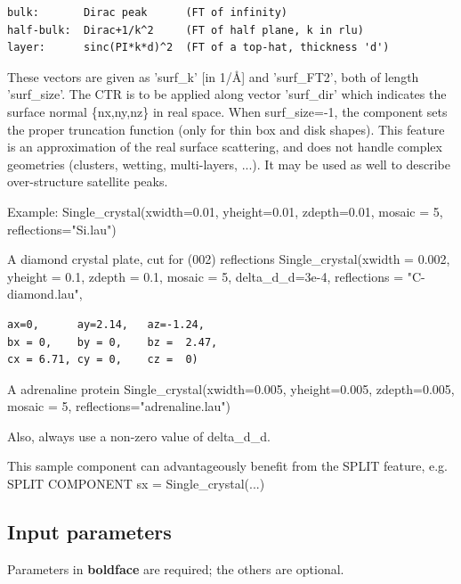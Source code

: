 \begin{verbatim}
bulk:       Dirac peak      (FT of infinity)
half-bulk:  Dirac+1/k^2     (FT of half plane, k in rlu)
layer:      sinc(PI*k*d)^2  (FT of a top-hat, thickness 'd')
\end{verbatim}

These vectors are given as 'surf\_k' [in 1/\AA{}] and 'surf\_FT2', both of length 'surf\_size'. The CTR is to be applied along vector 'surf\_dir' which indicates the surface normal \{nx,ny,nz\} in real space. When surf\_size=-1, the component sets the proper truncation function (only for thin box and disk shapes). This feature is an approximation of the real surface scattering, and does not handle complex geometries (clusters, wetting, multi-layers, ...). It may be used as well to describe over-structure satellite peaks.

Example: Single\_crystal(xwidth=0.01, yheight=0.01, zdepth=0.01, mosaic = 5, reflections="Si.lau")

A diamond crystal plate, cut for (002) reflections Single\_crystal(xwidth = 0.002, yheight = 0.1, zdepth = 0.1, mosaic = 5, delta\_d\_d=3e-4, reflections = "C-diamond.lau",

\begin{verbatim}
ax=0,      ay=2.14,   az=-1.24,
bx = 0,    by = 0,    bz =  2.47,
cx = 6.71, cy = 0,    cz =  0)
\end{verbatim}

A adrenaline protein Single\_crystal(xwidth=0.005, yheight=0.005, zdepth=0.005, mosaic = 5, reflections="adrenaline.lau")

Also, always use a non-zero value of delta\_d\_d.

This sample component can advantageously benefit from the SPLIT feature, e.g. SPLIT COMPONENT sx = Single\_crystal(...)

\subsection*{Input parameters}
Parameters in \textbf{boldface} are required; the others are optional.

